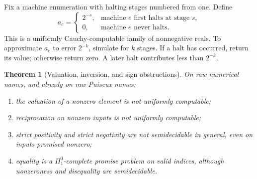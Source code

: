 \documentclass[11pt,letterpaper]{article}
\numberwithin{equation}{section}
\newtheorem{theorem}{Theorem}[section]
\theoremstyle{definition}
\theoremstyle{remark}
\begin{document}
Fix a machine enumeration with halting stages numbered from one. Define
\begin{equation}\label{eq:ae}
 a_e=\begin{cases}
 2^{-s},&\text{machine }e\text{ first halts at stage }s,\\
 0,&\text{machine }e\text{ never halts}.
 \end{cases}
\end{equation}
This is a uniformly Cauchy-computable family of nonnegative reals. To
approximate $a_e$ to error $2^{-k}$, simulate for $k$ stages. If a halt has
occurred, return its value; otherwise return zero. A later halt contributes
less than $2^{-k}$.

\begin{theorem}[Valuation, inversion, and sign obstructions]
\label{thm:inversehard}
On raw numerical names, and already on raw Puiseux names:
\begin{enumerate}[label=\textup{(\roman*)},leftmargin=2em]
\item the valuation of a nonzero element is not uniformly computable;
\item reciprocation on nonzero inputs is not uniformly computable;
\item strict positivity and strict negativity are not semidecidable in
general, even on inputs promised nonzero;
\item equality is a $\Pi^0_1$-complete promise problem on valid indices,
although nonzeroness and disequality are semidecidable.
\end{enumerate}
\end{theorem}
\end{document}
